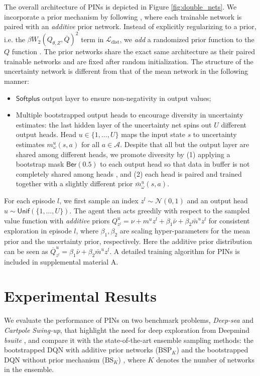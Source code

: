 \documentclass[letterpaper]{article} %
\newcommand{\Sp}[1]{\left(#1\right)}
\theoremstyle{definition}
\begin{document}
The overall architecture of PINs is depicted in Figure \ref{fig:double_nets}. We incorporate a prior mechanism by following \cite{osband2018randomized}, where each trainable network is paired with an \emph{additive} prior network. Instead of explicitly regularizing to a prior, i.e. the $\beta W_2\Sp{Q_{\theta, Z}, \overline{Q}}^2$ term in $\mathcal{L}_{\mathrm{dist}}$, we \emph{add} a randomized prior function to the $Q$ function \cite{osband2018randomized}. The prior networks share the exact same architecture as their paired trainable networks and are fixed after random initialization. The structure of the uncertainty network is different from that of the mean network in the following manner:
\begin{itemize}
\item $\mathsf{Softplus}$ \cite{glorot2011deep} output layer to ensure non-negativity in output
values;
\item Multiple bootstrapped output heads to encourage diversity in uncertainty estimates: the last hidden layer of the uncertainty net spins out $U$ different output heads. Head $u \in \{1, \dots, U\}$ maps the input state $s$ to uncertainty estimates $m_\omega^u (s, a)$ for all $a \in \mathcal{A}$. Despite that all but the output layer are shared among different heads, we promote diversity by (1) applying a bootstrap mask $\mathsf{Ber}(0.5)$ to each output head so that data in buffer is not completely shared among heads \cite{osband2016deep}, and (2) each head is paired and trained together with a slightly different prior $\bar{m}_{\bar{\omega}}^u(s,a)$.
\end{itemize}
For each episode $l$, we first sample an index $z^l \sim \mathcal{N}(0, 1)$ and an output head $u \sim \mathsf{Unif}(\{1, \dots, U\})$. The agent then acts greedily with respect to the sampled value function with \emph{additive} priors $Q^u_{z^l} = \nu + m^u z^l + \beta_1 \bar{\nu} + \beta_2 \bar{m}^u z^l$ for consistent exploration in episode $l$, where $\beta_1, \beta_2$ are scaling hyper-parameters for the mean prior and the uncertainty prior, respectively. Here the additive prior distribution can be seen as $\overline{Q}^u_{z^l} = \beta_1 \bar{\nu} + \beta_2 \bar{m}^u z^l$. A detailed training algorithm for PINs is included in supplemental material A.

\section{Experimental Results}

We evaluate the performance of PINs on two benchmark problems, \textit{Deep-sea} and \textit{Cartpole Swing-up}, that highlight the need for deep exploration from Deepmind \textit{bsuite} \cite{osband2019bsuite}, and compare it with the state-of-the-art ensemble sampling methods: the bootstrapped DQN with additive prior networks ($\mathrm{BSP}_K$) \cite{osband2018randomized} and the bootstrapped DQN without prior mechanism ($\mathrm{BS}_{K}$) \cite{osband2016deep}, where $K$ denotes the number of networks in the ensemble.
\end{document}
